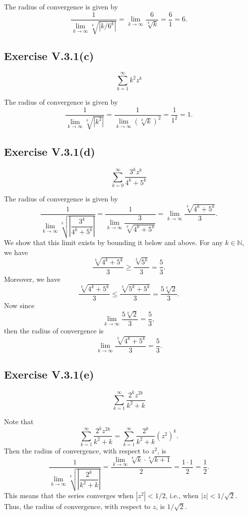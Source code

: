 \documentclass[12pt]{article}
\newenvironment{problem}
    {\begin{lrbox}{\mybox}\begin{minipage}{0.98\textwidth}}
    {\end{minipage}\end{lrbox}\framebox[\textwidth]{\usebox{\mybox}}}
\newcommand{\N}{\mathbb{N}}
\newcommand{\klim}{\lim\limits_{k \to \infty}}
\begin{document}
The radius of convergence is given by
\[
    \frac{1}{\klim \sqrt[k]{|k/6^k|}} = \klim \frac{6}{\sqrt[k]{k}} = \frac61 = 6.
\]

\subsection{Exercise V.3.1(c)}
\begin{problem}
    \[
        \sum_{k=1}^\infty k^2 z^k
    \]
\end{problem}
\medskip

The radius of convergence is given by
\[
    \frac{1}{\klim \sqrt[k]{|k^2|}} = \frac{1}{\klim \left( \sqrt[k]{k} \right)^2} = \frac{1}{1^2} = 1.
\]

\newpage
\subsection{Exercise V.3.1(d)}
\begin{problem}
    \[
        \sum_{k=0}^\infty \frac{3^k z^k}{4^k + 5^k}
    \]
\end{problem}
\medskip

The radius of convergence is given by
\[
    \frac{1}{\klim \sqrt[k]{\left|\dfrac{3^k}{4^k + 5^k} \right|}}
        = \frac{1}{\klim \dfrac{3}{\sqrt[k]{4^k + 5^k}}}
        = \klim \frac{\sqrt[k]{4^k + 5^k}}{3}.
\]
We show that this limit exists by bounding it below and above. For any $k \in \N$, we have
\[
    \frac{\sqrt[k]{4^k + 5^k}}{3} \geq \frac{\sqrt[k]{5^k}}{3} = \frac53.
\]
Moreover, we have
\[
    \frac{\sqrt[k]{4^k + 5^k}}{3} \leq \frac{\sqrt[k]{5^k + 5^k}}{3} = \frac{5\sqrt[k]{2}}{3}.
\]
Now since
\[
    \klim \frac{5\sqrt[k]{2}}{3} = \frac53,
\]
then the radius of convergence is
\[
    \klim \frac{\sqrt[k]{4^k + 5^k}}{3} = \frac53.
\]

\subsection{Exercise V.3.1(e)}
\begin{problem}
    \[
        \sum_{k=1}^\infty \frac{2^k z^{2k}}{k^2 + k}
    \]
\end{problem}
\medskip

Note that
\[
    \sum_{k=1}^\infty \frac{2^k z^{2k}}{k^2 + k} = \sum_{k=1}^\infty \frac{2^k}{k^2 + k} \left( z^2 \right)^k.
\]
Then the radius of convergence, with respect to $z^2$, is
\[
    \frac{1}{\klim \sqrt[k]{\left| \dfrac{2^k}{k^2 + k} \right|}}
        = \frac{\klim \sqrt[k]{k} \cdot \sqrt[k]{k+1}}{2}
        = \frac{1 \cdot 1}{2}
        = \frac12.
\]
This means that the series converges when $\left| z^2 \right| < 1/2$, i.e., when $|z| < 1/\sqrt{2}$. Thus, the radius of convergence, with respect to $z$, is $1/\sqrt{2}$.
\end{document}
